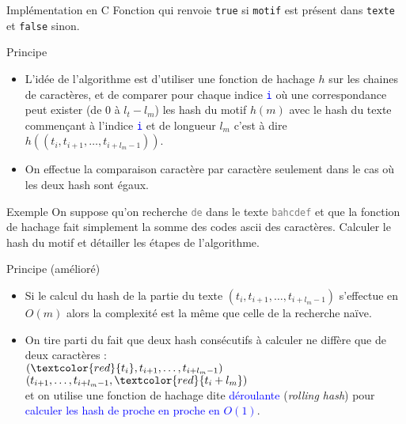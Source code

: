 \documentclass[10pt]{beamer}
\begin{document}
\begin{frame}{\Ctitle}{\stitle}
	\begin{block}{Implémentation en C}
		Fonction qui renvoie {\tt true} si {\tt motif} est présent dans {\tt texte} et {\tt false} sinon.
	\end{block}
\end{frame}

\begin{frame}{\Ctitle}{\stitle}
	\begin{block}{Principe}
		\begin{itemize}
		\item<1-> L'idée de l'algorithme est d'utiliser une fonction de hachage $h$ sur les chaines de caractères, et de comparer pour chaque indice \textcolor{blue}{\tt i} où une correspondance peut exister (de 0 à $l_t-l_m$) les hash du motif $h(m)$ avec le hash du texte commençant à l'indice \textcolor{blue}{\tt i} et de longueur $l_m$ c'est à dire $h((t_i,t_{i+1},\dots,t_{i+l_m-1}))$.
		\item<2-> On effectue la comparaison caractère par caractère seulement dans le cas où les deux hash sont égaux.
		\end{itemize}
	\end{block}
	{\begin{exampleblock}{Exemple}
		On suppose qu'on recherche \og{}\textcolor{gray}{\tt de}\fg{} dans le texte \og{}\textcolor{gray}{\tt bahcdef}\fg{} et que la fonction de hachage fait simplement la somme des codes {\sc ascii} des caractères. Calculer le hash du motif et détailler les étapes de l'algorithme.
	\end{exampleblock}}
\end{frame}

	\begin{frame}{\Ctitle}{\stitle}
		\begin{block}{Principe (amélioré)}
		\begin{itemize}
		\item<3-> Si le calcul du hash de la partie du texte $(t_i,t_{i+1},\dots,t_{i+l_m-1})$ s'effectue en $O(m)$ alors la complexité est la même que celle de la recherche naïve. 
		\item<4-> On tire parti du fait que deux hash consécutifs à calculer ne diffère que de deux caractères : \\
		$(\textcolor{red}{t_i},t_{i+1},\dots,t_{i+l_m-1})$ \\
		$(t_{i+1},\dots,t_{i+l_m-1},\textcolor{red}{t_i+l_m})$ \\
		 et on utilise une fonction de hachage dite \textcolor{blue}{déroulante} (\textit{rolling hash}) pour \textcolor{blue}{calculer les hash de proche en proche en $O(1)$}.
		\end{itemize}
	\end{block}
\end{frame}
\end{document}
